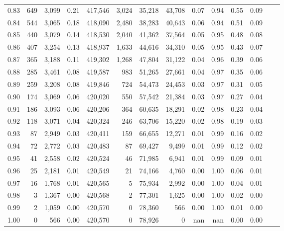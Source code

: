 \begin{tabular}{rrrrrrrrrrrrrr}
0.83 &    649 &  3,099 &     0.21 &  417,546 &    3,024 &  35,218 &  43,708 &  0.07 &  0.94 &  0.55 &      0.09 \\
0.84 &    544 &  3,065 &     0.18 &  418,090 &    2,480 &  38,283 &  40,643 &  0.06 &  0.94 &  0.51 &      0.09 \\
0.85 &    440 &  3,079 &     0.14 &  418,530 &    2,040 &  41,362 &  37,564 &  0.05 &  0.95 &  0.48 &      0.08 \\
0.86 &    407 &  3,254 &     0.13 &  418,937 &    1,633 &  44,616 &  34,310 &  0.05 &  0.95 &  0.43 &      0.07 \\
0.87 &    365 &  3,188 &     0.11 &  419,302 &    1,268 &  47,804 &  31,122 &  0.04 &  0.96 &  0.39 &      0.06 \\
0.88 &    285 &  3,461 &     0.08 &  419,587 &      983 &  51,265 &  27,661 &  0.04 &  0.97 &  0.35 &      0.06 \\
0.89 &    259 &  3,208 &     0.08 &  419,846 &      724 &  54,473 &  24,453 &  0.03 &  0.97 &  0.31 &      0.05 \\
0.90 &    174 &  3,069 &     0.06 &  420,020 &      550 &  57,542 &  21,384 &  0.03 &  0.97 &  0.27 &      0.04 \\
0.91 &    186 &  3,093 &     0.06 &  420,206 &      364 &  60,635 &  18,291 &  0.02 &  0.98 &  0.23 &      0.04 \\
0.92 &    118 &  3,071 &     0.04 &  420,324 &      246 &  63,706 &  15,220 &  0.02 &  0.98 &  0.19 &      0.03 \\
0.93 &     87 &  2,949 &     0.03 &  420,411 &      159 &  66,655 &  12,271 &  0.01 &  0.99 &  0.16 &      0.02 \\
0.94 &     72 &  2,772 &     0.03 &  420,483 &       87 &  69,427 &   9,499 &  0.01 &  0.99 &  0.12 &      0.02 \\
0.95 &     41 &  2,558 &     0.02 &  420,524 &       46 &  71,985 &   6,941 &  0.01 &  0.99 &  0.09 &      0.01 \\
0.96 &     25 &  2,181 &     0.01 &  420,549 &       21 &  74,166 &   4,760 &  0.00 &  1.00 &  0.06 &      0.01 \\
0.97 &     16 &  1,768 &     0.01 &  420,565 &        5 &  75,934 &   2,992 &  0.00 &  1.00 &  0.04 &      0.01 \\
0.98 &      3 &  1,367 &     0.00 &  420,568 &        2 &  77,301 &   1,625 &  0.00 &  1.00 &  0.02 &      0.00 \\
0.99 &      2 &  1,059 &     0.00 &  420,570 &        0 &  78,360 &     566 &  0.00 &  1.00 &  0.01 &      0.00 \\
1.00 &      0 &    566 &     0.00 &  420,570 &        0 &  78,926 &       0 &   nan &   nan &  0.00 &      0.00 \\
\bottomrule
\end{tabular}
